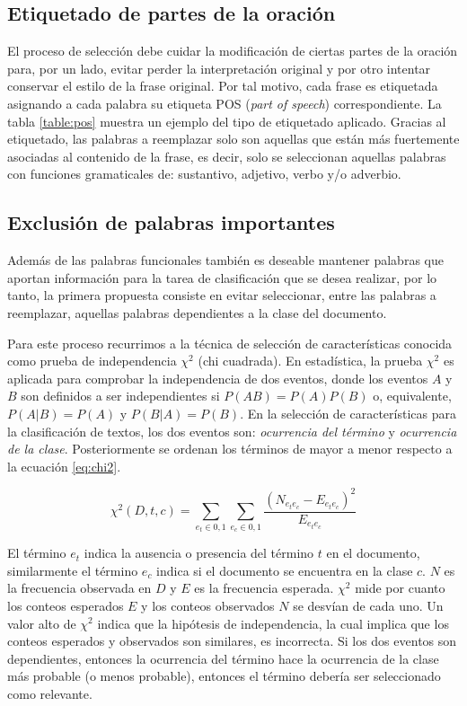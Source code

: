 \subsection{Etiquetado de partes de la oración}
El proceso de selección debe cuidar la modificación de ciertas partes de la oración para, por un lado, evitar perder la interpretación original y por otro intentar conservar el estilo de la frase original. Por tal motivo, cada frase es etiquetada asignando a cada palabra su etiqueta POS (\textit{part of speech}) correspondiente. La tabla \ref{table:pos} muestra un ejemplo del tipo de etiquetado aplicado. Gracias al etiquetado, las palabras a reemplazar solo son aquellas que están más fuertemente asociadas al contenido de la frase, es decir, solo se seleccionan aquellas palabras con funciones gramaticales de: sustantivo, adjetivo, verbo y/o adverbio.



\subsection{Exclusión de palabras importantes}

Además de las palabras funcionales también es deseable mantener palabras que aportan información para la tarea de clasificación que se desea realizar, por lo tanto, la primera propuesta consiste en evitar seleccionar, entre las palabras a reemplazar, aquellas palabras dependientes a la clase del documento. 

Para este proceso recurrimos a la técnica de selección de características conocida como prueba de independencia $\chi^2$ (chi cuadrada). En estadística, la prueba $\chi^2$ es aplicada para comprobar la independencia de dos eventos, donde los eventos $A$ y $B$ son definidos a ser independientes si $P(AB)= P(A)P(B)$ o, equivalente, $P(A|B)=P(A)$ y $P(B|A)=P(B)$. En la selección de características para la clasificación de textos, los dos eventos son: \textit{ocurrencia del término} y \textit{ocurrencia de la clase}. Posteriormente se ordenan los términos de mayor a menor respecto a la ecuación \ref{eq:chi2}.

\begin{equation}
    \label{eq:chi2}
    \chi^2(D, t, c)= \sum_{e_t \in {0,1} }^{} \sum_{e_c \in {0,1} }^{} \frac{(N_{e_t e_c} - E _{e_t e_c})^2}{E_{e_t e_c}}
\end{equation}

El término $e_t$ indica la ausencia o presencia del término $t$ en el documento, similarmente el término $e_c$ indica si el documento se encuentra en la clase $c$. $N$ es la frecuencia observada en $D$ y $E$ es la frecuencia esperada. $\chi^2$ mide por cuanto los conteos esperados $E$ y los conteos observados $N$ se desvían de cada uno. Un valor alto de $\chi^2$ indica que la hipótesis de independencia, la cual implica que los conteos esperados y observados son similares, es incorrecta. Si los dos eventos son dependientes, entonces la ocurrencia del término hace la ocurrencia de la clase más probable (o menos probable), entonces el término debería ser seleccionado como relevante.

